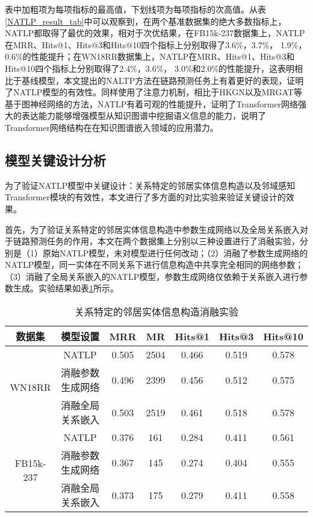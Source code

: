 表中加粗项为每项指标的最高值，下划线项为每项指标的次高值。从表\ref{NATLP_result_tab}中可以观察到，在两个基准数据集的绝大多数指标上，NATLP都取得了最优的效果，相对于次优结果，在FB15k-237数据集上，NATLP在MRR、Hits@1、Hits@3和Hits@10四个指标上分别取得了3.6\%，3.7\%， 1.9\%， 0.6\%的性能提升；在WN18RR数据集上，NATLP在MRR、Hits@1、Hits@3和Hits@10四个指标上分别取得了2.4\%，3.6\%， 3.0\%和2.0\%的性能提升，这表明相比于基线模型，本文提出的NALTP方法在链路预测任务上有着更好的表现，证明了NATLP模型的有效性。同样使用了注意力机制，相比于HKGN以及MRGAT等基于图神经网络的方法，NATLP有着可观的性能提升，证明了Transformer网络强大的表达能力能够增强模型从知识图谱中挖掘语义信息的能力，说明了Transformer网络结构在在知识图谱嵌入领域的应用潜力。

\subsection{模型关键设计分析}

为了验证NATLP模型中关键设计：关系特定的邻居实体信息构造以及邻域感知Transformer模块的有效性，本文进行了多方面的对比实验来验证关键设计的效果。

首先，为了验证关系特定的邻居实体信息构造中参数生成网络以及全局关系嵌入对于链路预测任务的作用，本文在两个数据集上分别以三种设置进行了消融实验，分别是（1）原始NATLP模型，未对模型进行任何改动；（2）消融了参数生成网络的NATLP模型，同一实体在不同关系下进行信息构造中共享完全相同的网络参数；（3）消融了全局关系嵌入的NATLP模型，参数生成网络仅依赖于关系嵌入进行参数生成。实验结果如表\ref{NATLP_ablation1}所示。

\begin{table}[htbp]
  \begin{center}
      \caption{关系特定的邻居实体信息构造消融实验}
      \setlength{\tabcolsep}{8pt}
      \renewcommand\arraystretch{1.5}
      \begin{tabular}{*{7}{c}}
          \toprule
          数据集 & 模型设置 & MRR&MR&Hits@1&Hits@3&	Hits@10\\
          \midrule
          \multirow{3}{*}{WN18RR}&NATLP&0.505&2504&0.466&0.519&0.578\\
          &消融参数生成网络&0.496&2399&0.456&0.512&0.575\\
          &消融全局关系嵌入&0.503&2519&0.461&0.518&0.578\\
          \cmidrule{1-7}
          \multirow{3}{*}{FB15k-237}&NATLP&0.376&161&0.284&0.411&0.561\\
          &消融参数生成网络&0.367&145&0.274&0.404&0.555\\
          &消融全局关系嵌入&0.373&175&0.279&0.411&0.558\\
          \bottomrule
      \end{tabular}
      \label{NATLP_ablation1}
  \end{center}
\end{table}

